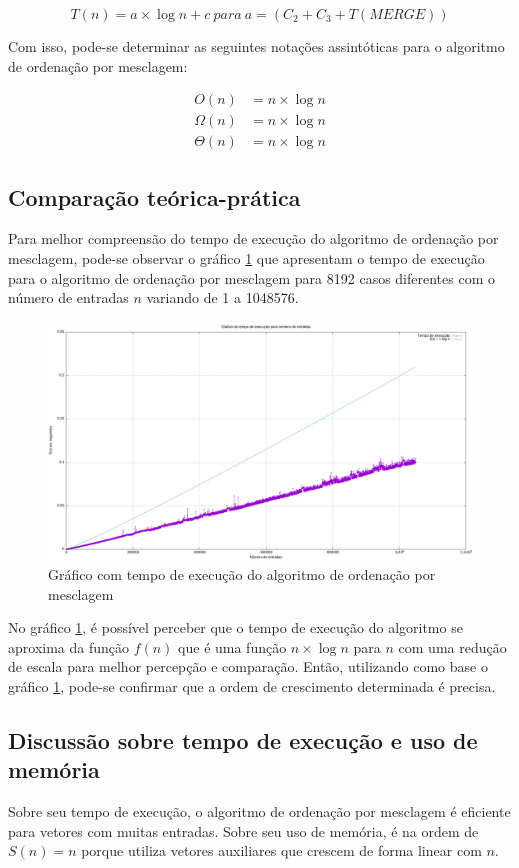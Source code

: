 \begin{equation} \label{cap:2:eq:mergeSort:2}
    T(n) = a \times \log n + c\  para\  a = (C_2 + C_3 + T(MERGE))
\end{equation}

Com isso, pode-se determinar as seguintes notações assintóticas para o algoritmo de ordenação por mesclagem:

\begin{align*} \label{cap:2:eq:mergeSort:3}
    O(n) &= n \times \log n \\ 
    \Omega(n) &= n \times \log n \\
    \Theta(n) &= n \times \log n
\end{align*}

\subsection{Comparação teórica-prática}

Para melhor compreensão do tempo de execução do algoritmo de ordenação por mesclagem, pode-se observar o gráfico 
\ref{cap:2:graph:mergeSort} que apresentam o tempo de execução para o algoritmo de ordenação por mesclagem
para 8192 casos diferentes com o número de entradas $n$ variando de 1 a 1048576.

\begin{figure}[h]
    \centering
    \includegraphics[width=\textwidth]{image/graphics/mergeSort.png}
    \caption{Gráfico com tempo de execução do algoritmo de ordenação por mesclagem}
    \label{cap:2:graph:mergeSort}
\end{figure}

No gráfico \ref{cap:2:graph:mergeSort}, é possível perceber que o tempo de execução do algoritmo se aproxima
da função $f(n)$ que é uma função $n \times \log n$ para $n$ com uma redução de escala para melhor percepção e comparação. Então,
utilizando como base o gráfico \ref{cap:2:graph:mergeSort}, pode-se confirmar que a ordem de crescimento determinada é
precisa.

\subsection{Discussão sobre tempo de execução e uso de memória}

Sobre seu tempo de execução, o algoritmo de ordenação por mesclagem é eficiente para
vetores com muitas entradas. Sobre seu uso de memória, é na ordem de $S(n) = n$ porque utiliza vetores auxiliares
que crescem de forma linear com $n$.

